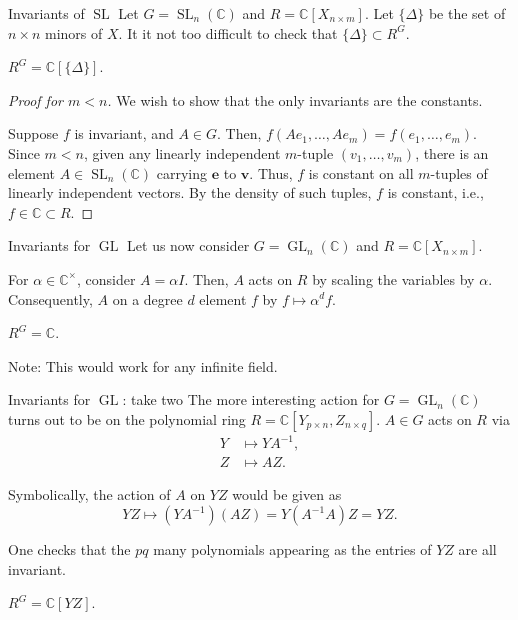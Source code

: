 \documentclass{beamer}
\DeclareMathOperator{\GL}{GL}
\DeclareMathOperator{\SL}{SL}
\begin{document}
	\begin{frame}{Invariants of \texorpdfstring{$\SL$}{SL}}
		Let $G = \SL_{n}(\mathbb{C})$ and $R = \mathbb{C}[X_{n \times m}]$. \pause Let $\{\Delta\}$ be the set of $n \times n$ minors of $X$. \pause It it not too difficult to check that $\{\Delta\} \subset R^{G}$. \pause

		\begin{theorem}
			$R^{G} = \mathbb{C}[\{\Delta\}]$.
		\end{theorem}
		\pause
		\begin{proof}[Proof for $m < n$]
			We wish to show that the only invariants are the constants. \pause

			Suppose $f$ is invariant, and $A \in G$. \pause Then, $f(Ae_{1}, \ldots, Ae_{m}) = f(e_{1}, \ldots, e_{m})$. \pause Since $m < n$, given any linearly independent $m$-tuple $(v_{1}, \ldots, v_{m})$, there is an element $A \in \SL_{n}(\mathbb{C})$ carrying $\mathbf{e}$ to $\mathbf{v}$. \pause Thus, $f$ is constant on all $m$-tuples of linearly independent vectors. \pause By the density of such tuples, $f$ is constant, i.e., $f \in \mathbb{C} \subset R$.
		\end{proof}
	\end{frame}

	\begin{frame}{Invariants for \texorpdfstring{$\GL$}{GL}}
		Let us now consider $G = \GL_{n}(\mathbb{C})$ and $R = \mathbb{C}[X_{n \times m}]$. \pause

		For $\alpha \in \mathbb{C}^{\times}$, consider $A = \alpha I$. \pause Then, $A$ acts on $R$ by scaling the variables by $\alpha$. \pause Consequently, $A$ on a degree $d$ element $f$ by $f \mapsto \alpha^{d} f$. \pause

		\begin{corollary}
			$R^{G} = \mathbb{C}$.
		\end{corollary}

		\pause Note: This would work for any infinite field.
	\end{frame}

	\begin{frame}{Invariants for \texorpdfstring{$\GL$}{GL}: take two}
		The more interesting action for $G = \GL_{n}(\mathbb{C})$ turns out to be on the polynomial ring $R = \mathbb{C}[Y_{p \times n}, Z_{n \times q}]$. \pause $A \in G$ acts on $R$ via
		\begin{align*} 
			Y &\mapsto Y A^{-1}, \\
			Z &\mapsto AZ.
		\end{align*}

		\pause 
		Symbolically, the action of $A$ on $YZ$ would be given as
		\begin{equation*} 
			YZ \mapsto (Y A^{-1}) (AZ) = Y (A^{-1} A) Z = YZ.
		\end{equation*}

		\pause

		One checks that the $pq$ many polynomials appearing as the entries of $YZ$ are all invariant.

		\pause 
		\begin{theorem}
			$R^{G} = \mathbb{C}[YZ]$.
		\end{theorem}
	\end{frame}
\end{document}

